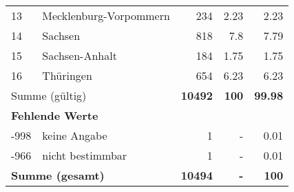 \begin{longtable}{lXrrr}
     13 &
     \multicolumn{1}{X}{ Mecklenburg-Vorpommern   } &


       \num{234} &
       \num[round-mode=places,round-precision=2]{2.23} &
         \num[round-mode=places,round-precision=2]{2.23} \\

     14 &
     \multicolumn{1}{X}{ Sachsen   } &


       \num{818} &
       \num[round-mode=places,round-precision=2]{7.8} &
         \num[round-mode=places,round-precision=2]{7.79} \\

     15 &
     \multicolumn{1}{X}{ Sachsen-Anhalt   } &


       \num{184} &
       \num[round-mode=places,round-precision=2]{1.75} &
         \num[round-mode=places,round-precision=2]{1.75} \\

     16 &
     \multicolumn{1}{X}{ Thüringen   } &


       \num{654} &
       \num[round-mode=places,round-precision=2]{6.23} &
         \num[round-mode=places,round-precision=2]{6.23} \\
     \midrule
     \multicolumn{2}{l}{Summe (gültig)} &
       \textbf{\num{10492}} &
     \textbf{\num{100}} &
       \textbf{\num[round-mode=places,round-precision=2]{99.98}} \\
     \multicolumn{5}{l}{\textbf{Fehlende Werte}}\\
       -998 &
       keine Angabe &
         \num{1} &
        - &
         \num[round-mode=places,round-precision=2]{0.01} \\
       -966 &
       nicht bestimmbar &
         \num{1} &
        - &
         \num[round-mode=places,round-precision=2]{0.01} \\
     \midrule
     \multicolumn{2}{l}{\textbf{Summe (gesamt)}} &
          \textbf{\num{10494}} &
        \textbf{-} &
        \textbf{\num{100}} \\
     \bottomrule
     \end{longtable}
     
